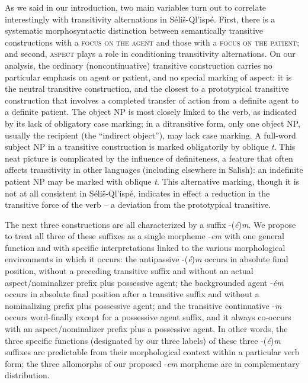 \documentclass[output=paper,colorlinks,citecolor=brown]{langscibook}
\begin{document}
As we said in our introduction, two main variables turn out to
correlate interestingly with transitivity alternations in
S\'eli\v{s}-Ql'isp\'e.  First, there is a systematic morphosyntactic
distinction between semantically transitive constructions with a
\textsc{focus on the agent} and those with a \textsc{focus on the
patient}; and second, \textsc{aspect} plays a role in conditioning
transitivity alternations.  On our analysis, the ordinary
(noncontinuative) transitive construction carries no particular
emphasis on agent or patient, and no special marking of aspect: it is
the neutral transitive construction, and the closest to a prototypical
transitive construction that involves a completed transfer of action
from a definite agent to a definite patient.  The object NP is most
closely linked to the verb, as indicated by its lack of obligatory
case marking; in a ditransitive form, only one object NP, usually the
recipient (the ``indirect object''), may lack case marking.  A
full-word subject NP in a transitive construction is marked
obligatorily by oblique \emph{t}.  This neat picture is complicated by
the influence of definiteness, a feature that often affects
transitivity in other languages (including elsewhere in Salish): an
indefinite patient NP may be marked with oblique \emph{t}.  This
alternative marking, though it is not at all consistent in
S\'eli\v{s}-Ql'isp\'e, indicates in effect a reduction in the
transitive force of the verb -- a deviation from the prototypical
transitive.


The next three constructions are all characterized by a suffix
-(\emph{\'e})\emph{m}.  We propose to treat all three of these
suffixes as a single morpheme -\emph{em} with one general function and
with specific interpretations linked to the various morphological
environments in which it occurs: the antipassive -(\emph{\'e})\emph{m}
occurs in absolute final position, without a preceding transitive
suffix and without an actual aspect/nominalizer prefix plus possessive
agent; the backgrounded agent -\emph{\'em} occurs in absolute final
position after a transitive suffix and without a nominalizing prefix
plus possessive agent; and the transitive continuative -\emph{m}
occurs word-finally except for a possessive agent suffix, and it
always co-occurs with an aspect/nominalizer prefix plus a possessive
agent.  In other words, the three specific functions (designated by
our three labels) of these three -(\emph{\'e})\emph{m}  suffixes are
 predictable from their morphological context within a particular
 verb form; the three allomorphs of our proposed -\emph{em}
 morpheme are in complementary distribution.
\end{document}
